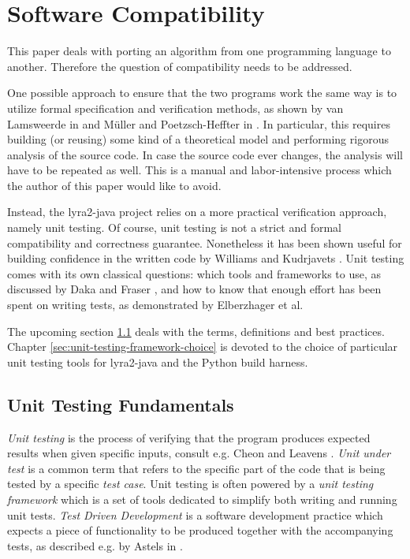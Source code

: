 \section{Software Compatibility}
\label{sec:software-compatibility}

This paper deals with porting an algorithm from one programming language to another. Therefore the question of compatibility needs to be addressed.

One possible approach to ensure that the two programs work the same way is to utilize formal specification and verification methods, as shown by van Lamsweerde in \cite{lamsweerde:2000:formal-specification} and Müller and Poetzsch-Heffter in \cite{mueller:1994:formal-specification}. In particular, this requires building (or reusing) some kind of a theoretical model and performing rigorous analysis of the source code. In case the source code ever changes, the analysis will have to be repeated as well. This is a manual and labor-intensive process which the author of this paper would like to avoid.

Instead, the lyra2-java project relies on a more practical verification approach, namely unit testing. Of course, unit testing is not a strict and formal compatibility and correctness guarantee. Nonetheless it has been shown useful for building confidence in the written code by Williams and Kudrjavets \cite{williams:2010:unit-tests-rock}. Unit testing comes with its own classical questions: which tools and frameworks to use, as discussed by Daka and Fraser \cite{daka:2014:unit-testing-tools}, and how to know that enough effort has been spent on writing tests, as demonstrated by Elberzhager et al. \cite{elberzhager:2012:reducing-effort}

The upcoming section \ref{subsec:unit-testing-fundamentals} deals with the terms, definitions and best practices. Chapter \ref{sec:unit-testing-framework-choice} is devoted to the choice of particular unit testing tools for lyra2-java and the Python build harness.

\subsection{Unit Testing Fundamentals}
\label{subsec:unit-testing-fundamentals}

\emph{Unit testing} is the process of verifying that the program produces expected results when given specific inputs, consult e.g. Cheon and Leavens \cite{cheon2002simple}. \emph{Unit under test} is a common term that refers to the specific part of the code that is being tested by a specific \emph{test case}. Unit testing is often powered by a \emph{unit testing framework} which is a set of tools dedicated to simplify both writing and running unit tests. \emph{Test Driven Development} is a software development practice which expects a piece of functionality to be produced together with the accompanying tests, as described e.g. by Astels in \cite{Astels:2003:TDD:864016}.

